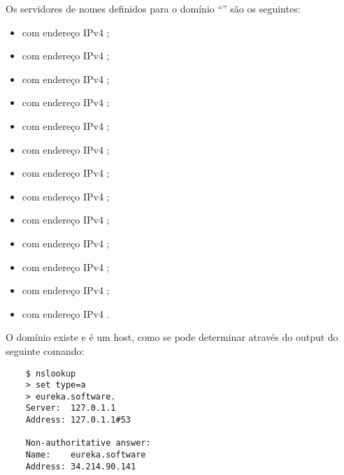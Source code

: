 \noindent Os servidores de nomes definidos para o domínio ``'' são os seguintes:

\begin{itemize}
    \item {} com endereço IPv4 ;
    \item {} com endereço IPv4 ;
    \item {} com endereço IPv4 ;
    \item {} com endereço IPv4 ;
	\item {} com endereço IPv4 ;
	\item {} com endereço IPv4 ;
	\item {} com endereço IPv4 ;
	\item {} com endereço IPv4 ;
	\item {} com endereço IPv4 ;
	\item {} com endereço IPv4 ;
	\item {} com endereço IPv4 ;
	\item {} com endereço IPv4 ;
	\item {} com endereço IPv4 .
\end{itemize}



\noindent O domínio  existe e é um host, como se pode determinar através do output do seguinte comando:

\begin{verbatim}
    $ nslookup
    > set type=a
    > eureka.software.
    Server:  127.0.1.1
    Address: 127.0.1.1#53

    Non-authoritative answer:
    Name:    eureka.software
    Address: 34.214.90.141
\end{verbatim}


